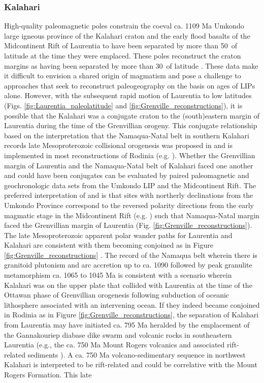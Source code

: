\documentclass[twocolumn, switch]{article} %
\begin{document}
\subsubsection{Kalahari}

High-quality paleomagnetic poles constrain the coeval ca. 1109 Ma Umkondo large igneous province of the Kalahari craton and the early flood basalts of the Midcontinent Rift of Laurentia to have been separated by more than 50\textdegree\ of latitude at the time they were emplaced. These poles reconstruct the craton margins as having been separated by more than 30\textdegree\ of latitude \citep{Swanson-Hysell2015a}. These data make it difficult to envision a shared origin of magmatism and pose a challenge to approaches that seek to reconstruct paleogeography on the basis on ages of LIPs alone. However, with the subsequent rapid motion of Laurentia to low latitudes (Figs. \ref{fig:Laurentia_paleolatitude} and \ref{fig:Grenville_reconstructions}), it is possible that the Kalahari was a conjugate craton to the (south)eastern margin of Laurentia during the time of the Grenvillian orogeny. This conjugate relationship based on the interpretation that the Namaqua-Natal belt in southern Kalahari records late Mesoproterozoic collisional orogenesis was proposed in \cite{Hoffman1991a} and is implemented in most reconstructions of Rodinia (e.g. \citealp{Li2008a}). Whether the Grenvillian margin of Laurentia and the Namaqua-Natal belt of Kalahari faced one another and could have been conjugates can be evaluated by paired paleomagnetic and geochronologic data sets from the Umkondo LIP and the Midcontinent Rift. The preferred interpretation of \cite{Swanson-Hysell2015a} and \cite{Kasbohm2015a} is that sites with northerly declinations from the Umkondo Province correspond to the reversed polarity directions from the early magmatic stage in the Midcontinent Rift (e.g. \citealp{Swanson-Hysell2014a}) such that Namaqua-Natal margin faced the Grenvillian margin of Laurentia (Fig. \ref{fig:Grenville_reconstructions}). The late Mesoproterozoic apparent polar wander paths for Laurentia and Kalahari are consistent with them becoming conjoined as in Figure \ref{fig:Grenville_reconstructions} \citep{Swanson-Hysell2015a}. The record of the Namaqua belt wherein there is granitoid plutonism and arc accretion up to ca. 1090 followed by peak granulite metamorphism ca. 1065 to 1045 Ma \citep{Diener2013a, Spencer2015a} is consistent with a scenario wherein Kalahari was on the upper plate that collided with Laurentia at the time of the Ottawan phase of Grenvillian orogenesis following subduction of oceanic lithosphere associated with an intervening ocean. If they indeed became conjoined in Rodinia as in Figure \ref{fig:Grenville_reconstructions}, the separation of Kalahari from Laurentia may have initiated ca. 795 Ma heralded by the emplacement of the Gannakouriep diabase dike swarm \citep{Rioux2010a, DeKock2021a} and volcanic rocks in southeastern Laurentia (e.g., the ca. 750 Ma Mount Rogers volcanics and associated rift-related sediments \cite{Aleinikoff1995a, MacLennan2020a}). A ca. 750 Ma volcano-sedimentary sequence in northwest Kalahari is interpreted to be rift-related \citep{Borg2003a}  and could be correlative with the Mount Rogers Formation. This late 
\end{document}
